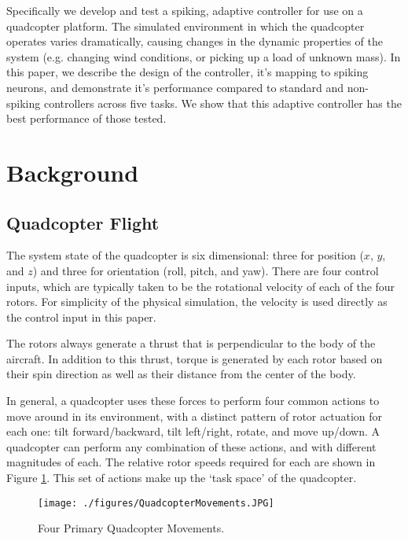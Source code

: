 \documentclass[letterpaper, 10 pt, conference]{ieeeconf}  %
\begin{document}
Specifically we develop and test a spiking, adaptive controller for use on a quadcopter platform.
The simulated environment in which the quadcopter operates varies dramatically, causing changes in the dynamic properties of the system (e.g. changing wind conditions, or picking up a load of unknown mass).
In this paper, we describe the design of the controller, it's mapping to spiking neurons, and demonstrate it's performance compared to standard and non-spiking controllers across five tasks.
We show that this adaptive controller has the best performance of those tested.

\section{Background}

\subsection{Quadcopter Flight}

The system state of the quadcopter is six dimensional: three for position ($x$, $y$, and $z$) and three for orientation (roll, pitch, and yaw). 
There are four control inputs, which are typically taken to be the rotational velocity of each of the four rotors. For simplicity of the physical simulation, the velocity is used directly as the control input in this paper. 

The rotors always generate a thrust that is perpendicular to the body of the aircraft. 
In addition to this thrust, torque is generated by each rotor based on their spin direction  as well as their distance from the center of the body.

In general, a quadcopter uses these forces to perform four common actions to move around in its environment, with a distinct pattern of rotor actuation for each one: 
tilt forward/backward, tilt left/right, rotate, and move up/down. 
A quadcopter can perform any combination of these actions, and with different magnitudes of each. The relative rotor speeds required for each are shown in Figure \ref{fig:actions}. This set of actions make up the `task space' of the quadcopter.

\begin{figure}
\centering
\texttt{[image: ./figures/QuadcopterMovements.JPG]}
\caption{Four Primary Quadcopter Movements. \cite{harsha}}
\label{fig:actions}
\end{figure}
\end{document}
